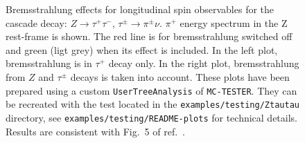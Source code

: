 \documentclass[]{Photos_interface_design}
\begin{document}
\begin{figure}[h!]
\centering
{}
\caption{ Bremsstrahlung effects for longitudinal spin observables
for the cascade decay: $Z \to \tau^+ \tau^-$, $\tau^\pm \to \pi^\pm\nu$.
$\pi^+$ energy spectrum in the Z rest-frame  is shown. The red line is for 
bremsstrahlung switched off
and green (ligt grey) when its effect is included. 
In the left plot, bremsstrahlung is in $\tau^+ $ decay only.
In the right plot, bremsstrahlung from $Z$ and  $\tau^\pm$ decays is
taken into account.
These plots have been prepared using a custom {\tt UserTreeAnalysis} of {\tt MC-TESTER}.
They  can be recreated with the test located in the {\tt examples/testing/Ztautau} directory, see  {\tt examples/testing/README-plots} for technical details. Results are 
consistent with Fig.~5 of ref.~\cite{Eberhard:1989ve}.
\label{fig:KKMC}
}
\end{figure}
\end{document}
